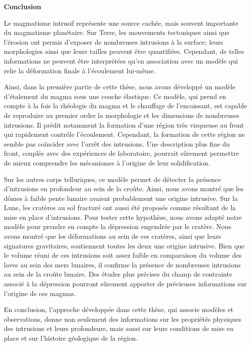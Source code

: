 \thispagestyle{plain}
\begin{center}
 \Large \vspace{.5cm} \textbf{Conclusion}
\end{center}

Le  magmatisme intrusif  représente  une source  cachée, mais  souvent
importante  du  magmatisme  planétaire.   Sur  Terre,  les  mouvements
tectoniques  ainsi que  l’érosion ont  permis d’exposer  de nombreuses
intrusions à  la surface; leurs  morphologies ainsi que  leurs tailles
peuvent être quantifiées. Cependant, de telles informations ne peuvent
être  interprétées  qu’en association  avec  un  modèle qui  relie  la
déformation finale à l’écoulement lui-même.

Ainsi, dans la première partie de cette thèse, nous avons développé un
modèle d’étalement du magma sous  une couche élastique. Ce modèle, qui
prend en  compte à la  fois la rhéologie du  magma et le  chauffage de
l’encaissant,  est   capable  de   reproduire  au  premier   ordre  la
morphologie  et les  dimensions de  nombreuses intrusions.   Il prédit
notamment  la  formation d’une  région  très  visqueuse au  front  qui
rapidement contrôle  l’écoulement.  Cependant,  la formation  de cette
région  ne semble  pas  coïncider avec  l’arrêt  des intrusions.   Une
description  plus  fine du  front,  couplée  avec des  expériences  de
laboratoire,  pourrait  sûrement  permettre de  mieux  comprendre  les
mécanismes à l’origine de leur solidification.

Sur  les autres  corps telluriques,  ce modèle  permet de  détecter la
présence d’intrusions en profondeur au  sein de la croûte. Ainsi, nous
avons montré que les dômes à faible pente lunaire avaient probablement
une origine intrusive.  Sur la Lune,  les cratères au sol fracturé ont
aussi été proposés  comme résultant de la mise  en place d’intrusions.
Pour  tester cette  hypothèse,  nous avons  adapté  notre modèle  pour
prendre en compte la dépression  engendrée par le cratère.  Nous avons
montré que les  déformations au sein de ces cratères,  ainsi que leurs
signatures  gravitaires,  soutiennent  toutes  les  deux  une  origine
intrusive.   Bien que  le volume  réuni de  ces intrusions  soit assez
faible en comparaison  du volume des laves au sein  des mers lunaires,
il confirme la présence de nombreuses  intrusions au sein de la croûte
lunaire. Des études plus précises du  champ de contrainte associé à la
dépression pourront  sûrement apporter de précieuses  informations sur
l’origine de ces magmas.

En  conclusion, l’approche  développée dans  cette thèse,  qui associe
modèles et observations, donne non  seulement des informations sur les
propriétés physiques  des intrusions et leurs  profondeurs, mais aussi
sur leurs conditions de mise en  place et sur l’histoire géologique de
la région.





